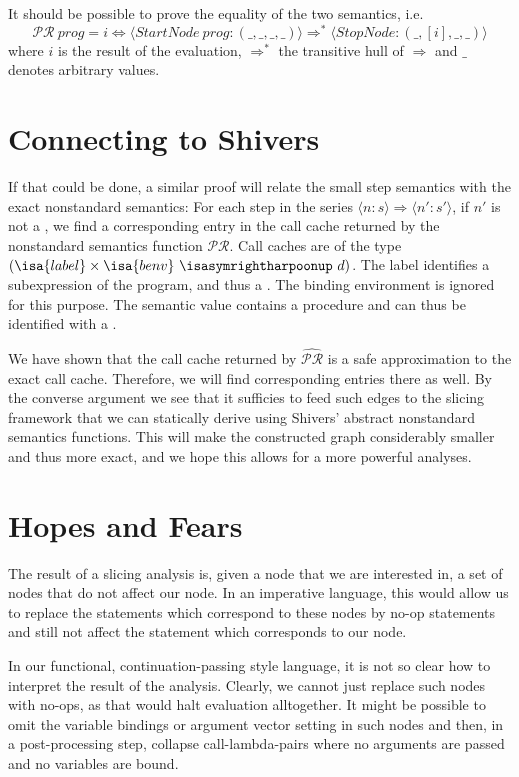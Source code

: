 \documentclass[a4paper,halfparskip,DIV=10,11pt]{scrbook}
\newcommand{\PR}{\mathcal {PR}}
\newcommand{\aPR}{\widehat{\mathcal {PR}}}
\begin{document}
It should be possible to prove the equality of the two semantics, i.e.
\[
\PR\ prog = i
\iff
\langle StartNode\ prog : (\_,\_,\_,\_)\rangle \Rightarrow^* \langle StopNode : (\_,[i],\_,\_)\rangle
\]
where $i$ is the result of the evaluation, $\Rightarrow^*$ the transitive hull of $\Rightarrow$ and $\_$ denotes arbitrary values.

\section{Connecting to Shivers}

If that could be done, a similar proof will relate the small step semantics with the exact nonstandard semantics: For each step in the series $\langle n:s\rangle \Rightarrow \langle n':s'\rangle$, if $n'$ is not a , we find a corresponding entry in the call cache returned by the nonstandard semantics function $\PR$. Call caches are of the type $(\isa{label}\times\isa{benv}\ \isasymrightharpoonup\ d)$. The label identifies a subexpression of the program, and thus a . The binding environment is ignored for this purpose. The semantic value  contains a procedure and can thus be identified with a .

We have shown that the call cache returned by $\aPR$ is a safe approximation to the exact call cache. Therefore, we will find corresponding entries there as well. By the converse argument we see that it sufficies to feed such edges to the slicing framework that we can statically derive using Shivers’ abstract nonstandard semantics functions. This will make the constructed graph considerably smaller and thus more exact, and we hope this allows for a more powerful analyses.

\section{Hopes and Fears}

The result of a slicing analysis is, given a node that we are interested in, a set of nodes that do not affect our node. In an imperative language, this would allow us to replace the statements which correspond to these nodes by no-op statements and still not affect the statement which corresponds to our node.

In our functional, continuation-passing style language, it is not so clear how to interpret the result of the analysis. Clearly, we cannot just replace such nodes with no-ops, as that would halt evaluation alltogether. It might be possible to omit the variable bindings or argument vector setting in such nodes and then, in a post-processing step, collapse call-lambda-pairs where no arguments are passed and no variables are bound.
\end{document}
